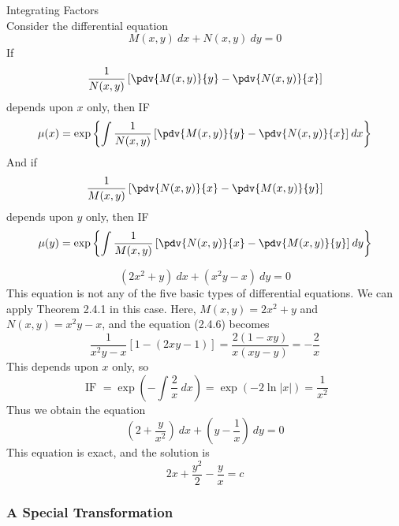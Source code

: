 \begin{theorem}{Integrating Factors}{}
    \\Consider the differential equation
    \begin{equation}
        M(x,y) \: d{x} + N(x,y) \: d{y} = 0
    \end{equation}
    If
    \begin{equation}
        \frac{1}{N(x,y)} \left[ \pdv{M(x,y)}{y} - \pdv{N(x,y)}{x} \right]  
    \end{equation}
    depends upon $x$ only, then IF
    \begin{equation}
        \mu(x) = \exp \left\{ \int{ \frac{1}{N(x,y)} \left[ \pdv{M(x,y)}{y} - \pdv{N(x,y)}{x} \right] } \: d{x} \right\}
    \end{equation}
    And if
    \begin{equation}
        \frac{1}{M(x,y)} \left[ \pdv{N(x,y)}{x} - \pdv{M(x,y)}{y} \right]
    \end{equation}
    depends upon $y$ only, then IF
    \begin{equation}
        \mu(y) = \exp \left\{ \int{ \frac{1}{M(x,y)} \left[ \pdv{N(x,y)}{x} - \pdv{M(x,y)}{y} \right] } \: d{y} \right\}
    \end{equation}
\end{theorem}

\begin{example}{\[
    (2x^2 + y) \: d{x} + (x^2y - x) \: d{y} = 0
\]}{}
    This equation is not any of the five basic types of differential equations. We can apply Theorem 2.4.1 in this case. Here, $M(x,y) = 2x^2+y$ and $N(x,y) = x^2y-x$, and the equation (2.4.6) becomes \[
        \frac{1}{x^2y-x} [1 - (2xy-1)] = \frac{2(1-xy)}{x(xy-y)} = -\frac{2}{x}
    \]
    This depends upon $x$ only, so \[
        \text{ IF } = \exp\left( -\int{\frac{2}{x}} \: d{x} \right) = \exp(-2\ln|x|) = \frac{1}{x^2}
    \]
    Thus we obtain the equation \[
        \left( 2 + \frac{y}{x^2} \right) \: d{x} + \left( y - \frac{1}{x} \right) \: d{y} = 0
    \]
    This equation is exact, and the solution is \[
        2x + \frac{y^2}{2} - \frac{y}{x} = c
    \]
\end{example}



\subsubsection{A Special Transformation}

